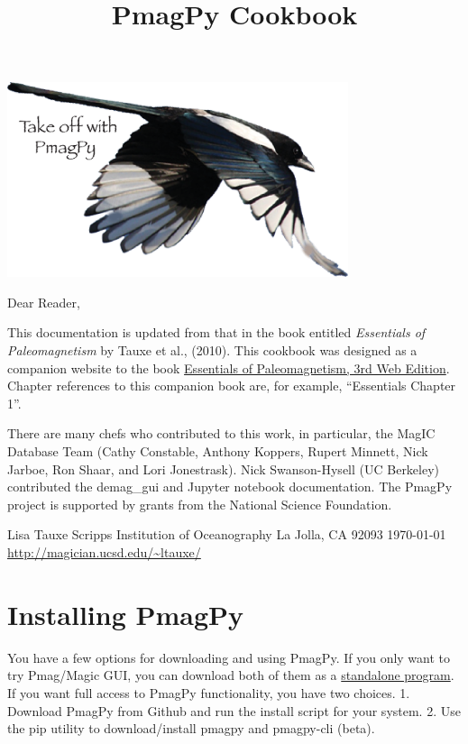 \documentclass[11pt]{book}
\begin{document}
 \setcounter{tocdepth}{3}
\tableofcontents


{\hskip 1in \includegraphics[width=10cm]{EPSfiles/logo.eps}

 \title{PmagPy Cookbook}

 \maketitle
\noindent Dear Reader,

This documentation is updated from that in the book entitled {\it Essentials of Paleomagnetism} by  Tauxe et al., (2010). \nocite{tauxe10}  This cookbook was designed as a companion website to the book \href{http://earthref.org/MAGIC/books/Tauxe/Essentials/WebBook3.html}{Essentials of Paleomagnetism, 3rd Web Edition}. Chapter references to this companion book are, for example, ``Essentials Chapter 1''.

There are many chefs who contributed to this work, in particular, the MagIC Database Team (Cathy Constable, Anthony Koppers, Rupert Minnett, Nick Jarboe, Ron Shaar, and Lori Jonestrask). Nick Swanson-Hysell (UC Berkeley) contributed the demag\_gui and Jupyter notebook documentation. The PmagPy project is supported by grants from the National Science Foundation.

{\obeylines
 Lisa Tauxe
 Scripps Institution of Oceanography
 La Jolla, CA 92093
 \today
  \url{http://magician.ucsd.edu/~ltauxe/}
 }


\chapter{Installing {\bf PmagPy}}

You have a few options for downloading and using PmagPy.  If you only want to try Pmag/Magic GUI, you can download both of them as a \href{#standalone}{standalone program}.  If you want full access to PmagPy functionality, you have two choices.  1. Download PmagPy from Github and run the install script for your system.  2.  Use the pip utility to download/install pmagpy and pmagpy-cli (beta).  

}
\end{document}
